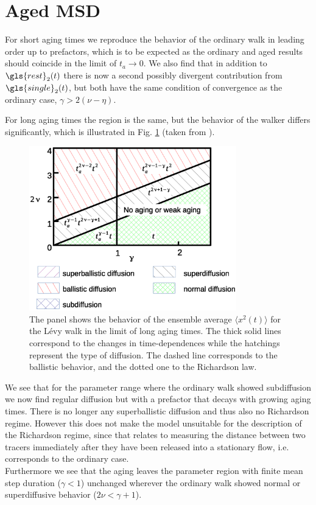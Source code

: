 
\section{Aged MSD}

For short aging times we reproduce the behavior of the ordinary walk in leading order up to prefactors, which is to be expected as the ordinary and aged results should coincide in the limit of $t_a \to 0$. We also find that in addition to $\gls{rest}_2(t)$ there is now a second possibly divergent contribution from $\gls{single}_2(t)$, but both have the same condition of convergence as the ordinary case, $\gamma > 2(\nu-\eta)$. 

For long aging times the region is the same, but the behavior of the walker differs significantly, which is illustrated in Fig. \ref{fig:resultsMSDaged} (taken from \cite{bothe}). 
%
\begin{figure}[h!]
\begin{center}
\includegraphics[width=90mm]{pics/resultsMSDaged.eps}
\caption{The panel shows the behavior of the ensemble average $\langle x^2(t) \rangle$ for the L\'evy walk in the limit of long aging times. The thick solid lines correspond to the changes in time-dependences while the hatchings represent the type of diffusion. The dashed line corresponds to the ballistic behavior, and the dotted one to the Richardson law.
\label{fig:resultsMSDaged} }
\end{center}
\end{figure} 
%
We see that for the parameter range where the ordinary walk showed subdiffusion we now find regular diffusion but with a prefactor that decays with growing aging times. There is no longer any superballistic diffusion and thus also no Richardson regime. However this does not make the model unsuitable for the description of the Richardson regime, since that relates to measuring the distance between two tracers immediately after they have been released into a stationary flow, i.e. corresponds to the ordinary case.\\ Furthermore we see that the aging leaves the parameter region with finite mean step duration ($\gamma<1$) unchanged wherever the ordinary walk showed normal or superdiffusive behavior ($2\nu < \gamma +1$).\\
